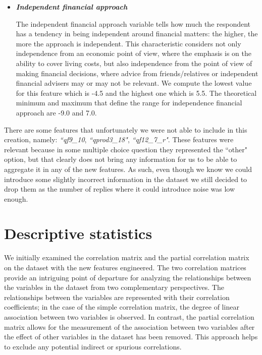 \documentclass[a4paper,11pt]{article}
\begin{document}
\begin{itemize}
\item{\textit{\textbf{Independent financial approach}}}

The independent financial approach variable tells how much the respondent has a tendency in being independent around financial matters: the higher, the more the approach is independent. This characteristic considers not only independence from an economic point of view, where the emphasis is on the ability to cover living costs, but also independence from the point of view of making financial decisions, where advice from friends/relatives or independent financial advisers may or may not be relevant. We compute the lowest value for this feature which is -4.5 and the highest one which is 5.5. The theoretical minimum and maximum that define the range for independence financial approach are -9.0 and 7.0.

\end{itemize}

There are some features that unfortunately we were not able to include in this creation, namely: \textit{``qf9\_10}, \textit{``qprod3\_18"}, \textit{``qf12\_7\_r"}. These features were relevant because in some multiple choice question they represented the ``other" option, but that clearly does not bring any information for us to be able to aggregate it in any of the new features. As such, even though we know we could introduce some slightly incorrect information in the dataset we still decided to drop them as the number of replies where it could introduce noise was low enough.

\section{Descriptive statistics}

We initially examined the correlation matrix and the partial correlation matrix on the dataset with the new features engineered. 
The two correlation matrices provide an intriguing point of departure for analyzing the relationships between the variables in the dataset from two complementary perspectives. The relationships between the variables are represented with their correlation coefficients; in the case of the simple correlation matrix, the degree of linear association between two variables is observed. In contrast, the partial correlation matrix allows for the measurement of the association between two variables after the effect of other variables in the dataset has been removed. This approach helps to exclude any potential indirect or spurious correlations. 
\end{document}
